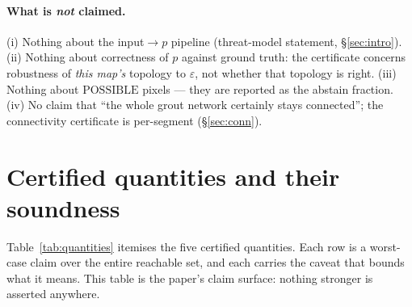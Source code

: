 \documentclass[10pt]{article}
\newcommand{\POSS}{\mathrm{POSSIBLE}}
\newcommand{\eps}{\varepsilon}
\begin{document}
\paragraph{What is \emph{not} claimed.} (i) Nothing about the
input$\to p$ pipeline (threat-model statement, \S\ref{sec:intro}).
(ii) Nothing about correctness of $p$ against ground truth: the
certificate concerns robustness of \emph{this map's} topology to $\eps$,
not whether that topology is right. (iii) Nothing about $\POSS$ pixels ---
they are reported as the abstain fraction. (iv) No
claim that ``the whole grout network certainly stays connected''; the
connectivity certificate is per-segment (\S\ref{sec:conn}).

\section{Certified quantities and their soundness}\label{sec:quantities}

Table~\ref{tab:quantities} itemises the five certified quantities. Each
row is a worst-case claim over the entire reachable set, and each carries
the caveat that bounds what it means. This table is the paper's claim
surface: nothing stronger is asserted anywhere.
\end{document}
